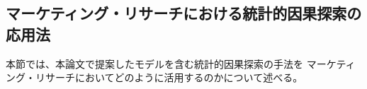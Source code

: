 
\subsection{マーケティング・リサーチにおける統計的因果探索の応用法}

本節では、本論文で提案したモデルを含む統計的因果探索の手法を
マーケティング・リサーチにおいてどのように活用するのかについて述べる。
